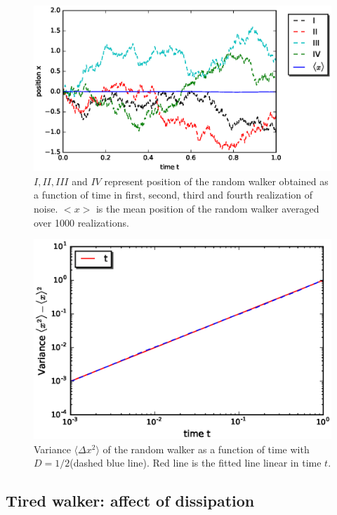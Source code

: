 \documentclass[11pt,a4paper]{article}
\begin{document}
\begin{figure}[!htbp]
\centering
\includegraphics[scale=0.67]{x_mean.eps}
\caption{$I, II, III$ and $IV$ represent position of the random walker obtained as a function of time in first, second, third and fourth realization of noise. $<x>$ is the mean position of the random walker averaged  over 1000 realizations.}
\label{meanx}
\end{figure}



\begin{figure}[!htbp]
\centering
\includegraphics[scale=0.67]{x_var.eps}
\caption{ Variance $\langle \Delta x ^2\rangle$ of the random walker as a function of time with $D=1/2$(dashed blue line).  Red line is the fitted line linear in time $t$.  }
\label{varx}
\end{figure}




\subsection*{Tired walker: affect of dissipation}
\end{document}
